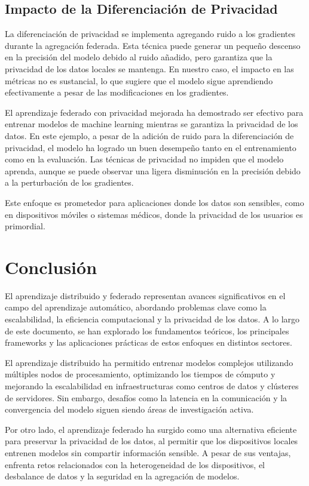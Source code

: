 \subsection{Impacto de la Diferenciación de Privacidad}

La diferenciación de privacidad se implementa agregando ruido a los gradientes durante la agregación federada. Esta técnica puede generar un pequeño descenso en la precisión del modelo debido al ruido añadido, pero garantiza que la privacidad de los datos locales se mantenga. En nuestro caso, el impacto en las métricas no es sustancial, lo que sugiere que el modelo sigue aprendiendo efectivamente a pesar de las modificaciones en los gradientes.

El aprendizaje federado con privacidad mejorada ha demostrado ser efectivo para entrenar modelos de machine learning mientras se garantiza la privacidad de los datos. En este ejemplo, a pesar de la adición de ruido para la diferenciación de privacidad, el modelo ha logrado un buen desempeño tanto en el entrenamiento como en la evaluación. Las técnicas de privacidad no impiden que el modelo aprenda, aunque se puede observar una ligera disminución en la precisión debido a la perturbación de los gradientes.

Este enfoque es prometedor para aplicaciones donde los datos son sensibles, como en dispositivos móviles o sistemas médicos, donde la privacidad de los usuarios es primordial.

\section{Conclusión}
El aprendizaje distribuido y federado representan avances significativos en el campo del aprendizaje automático, abordando problemas clave como la escalabilidad, la eficiencia computacional y la privacidad de los datos. A lo largo de este documento, se han explorado los fundamentos teóricos, los principales frameworks y las aplicaciones prácticas de estos enfoques en distintos sectores.

El aprendizaje distribuido ha permitido entrenar modelos complejos utilizando múltiples nodos de procesamiento, optimizando los tiempos de cómputo y mejorando la escalabilidad en infraestructuras como centros de datos y clústeres de servidores. Sin embargo, desafíos como la latencia en la comunicación y la convergencia del modelo siguen siendo áreas de investigación activa.

Por otro lado, el aprendizaje federado ha surgido como una alternativa eficiente para preservar la privacidad de los datos, al permitir que los dispositivos locales entrenen modelos sin compartir información sensible. A pesar de sus ventajas, enfrenta retos relacionados con la heterogeneidad de los dispositivos, el desbalance de datos y la seguridad en la agregación de modelos.

